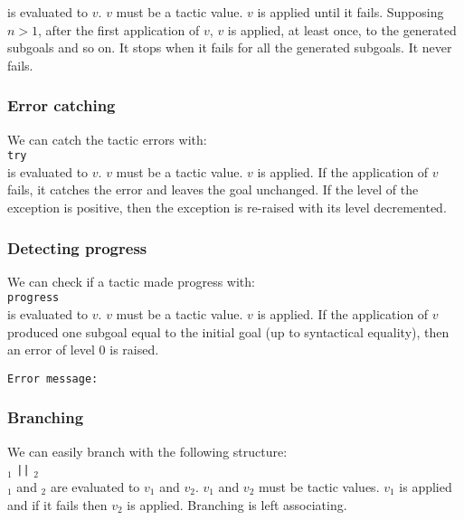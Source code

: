 {\tacexpr} is evaluated to $v$. $v$ must be a tactic value. $v$ is
applied until it fails. Supposing $n>1$, after the first application
of $v$, $v$ is applied, at least once, to the generated subgoals and
so on. It stops when it fails for all the generated subgoals. It never
fails.

\subsubsection{Error catching}

We can catch the tactic errors with:\\

{\tt try} {\tacexpr}\\

{\tacexpr} is evaluated to $v$. $v$ must be a tactic value. $v$ is
applied. If the application of $v$ fails, it catches the error and
leaves the goal unchanged. If the level of the exception is positive,
then the exception is re-raised with its level decremented.

\subsubsection{Detecting progress}

We can check if a tactic made progress with:\\

{\tt progress} {\tacexpr}\\

{\tacexpr} is evaluated to $v$. $v$ must be a tactic value. $v$ is
applied. If the application of $v$ produced one subgoal equal to the
initial goal (up to syntactical equality), then an error of level 0 is
raised. 

{\tt Error message:}\\


\subsubsection{Branching}
\tacindex{||}

We can easily branch with the following structure:\\

{\tacexpr}$_1$ {\tt ||} {\tacexpr}$_2$\\

{\tacexpr}$_1$ and {\tacexpr}$_2$ are evaluated to $v_1$ and
$v_2$. $v_1$ and $v_2$ must be tactic values. $v_1$ is applied and if
it fails then $v_2$ is applied. Branching is left associating.

